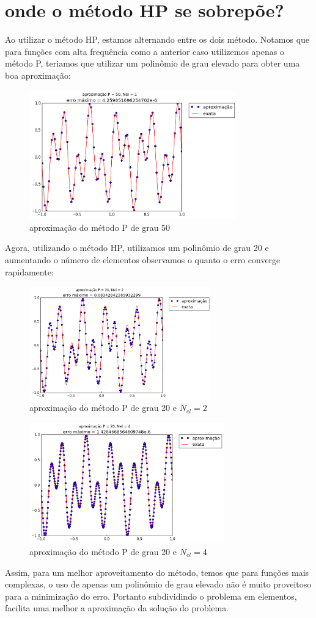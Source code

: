 \section{onde o método HP se sobrepõe?}
 Ao utilizar o método HP, estamos alternando entre os dois método. Notamos que para funções com alta frequência como a anterior caso utilizemos apenas o método P, teriamos que utilizar um polinômio de grau elevado para obter uma boa aproximação:
\begin{figure}[H]
\centering
\includegraphics[width=0.8\textwidth,center]{figuras/Neumm_1_50.png}
\caption{aproximação do método P de grau 50} 
\end{figure}
 Agora, utilizando o método HP, utilizamos um polinômio de grau 20 e aumentando o número de elementos observamos o quanto o erro converge rapidamente:\begin{figure}[H]
\centering
\includegraphics[width=0.7\textwidth,center]{figuras/Neumm_2_20.png}
\caption{aproximação do método P de grau 20 e $N_{el} = 2$} 
\end{figure}
\begin{figure}[H]
\centering
\includegraphics[width=0.75\textwidth,center]{figuras/Neumm_4_20.png}
\caption{aproximação do método P de grau 20 e $N_{el} = 4$} 
\end{figure}

Assim, para um melhor aproveitamento do método, temos que para funções mais complexas, o uso de apenas um polinômio de grau elevado não é muito proveitoso para a minimização  do erro. Portanto subdividindo o problema em elementos, facilita uma melhor a aproximação da solução do problema.